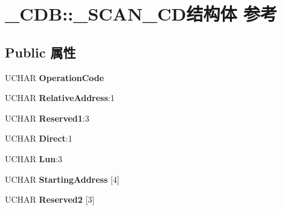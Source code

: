 \hypertarget{struct___c_d_b_1_1___s_c_a_n___c_d}{}\section{\+\_\+\+C\+DB\+:\+:\+\_\+\+S\+C\+A\+N\+\_\+\+C\+D结构体 参考}
\label{struct___c_d_b_1_1___s_c_a_n___c_d}
\subsection*{Public 属性}
\begin{DoxyCompactItemize}
\item 
\mbox{\label{struct___c_d_b_1_1___s_c_a_n___c_d_a2a7a7d76c1d5a0060f7855a33405addc}} 
U\+C\+H\+AR {\bfseries Operation\+Code}
\item 
\mbox{\label{struct___c_d_b_1_1___s_c_a_n___c_d_a9b01e1f32e7b703f6eb0a8378a0be89c}} 
U\+C\+H\+AR {\bfseries Relative\+Address}\+:1
\item 
\mbox{\label{struct___c_d_b_1_1___s_c_a_n___c_d_a214d9e380007d1fdadb6d8cce0f662ab}} 
U\+C\+H\+AR {\bfseries Reserved1}\+:3
\item 
\mbox{\label{struct___c_d_b_1_1___s_c_a_n___c_d_a9e21efede924f480050db7826cafb535}} 
U\+C\+H\+AR {\bfseries Direct}\+:1
\item 
\mbox{\label{struct___c_d_b_1_1___s_c_a_n___c_d_ae30f22d316cc8684063d58efca92b5af}} 
U\+C\+H\+AR {\bfseries Lun}\+:3
\item 
\mbox{\label{struct___c_d_b_1_1___s_c_a_n___c_d_aa4fad2ceeab1e68108b78feed5c5c12a}} 
U\+C\+H\+AR {\bfseries Starting\+Address} \mbox{[}4\mbox{]}
\item 
\mbox{\label{struct___c_d_b_1_1___s_c_a_n___c_d_adee83a7b26b0059bde8e92cb0e9462a9}} 
U\+C\+H\+AR {\bfseries Reserved2} \mbox{[}3\mbox{]}
\item 
\mbox{\label{struct___c_d_b_1_1___s_c_a_n___c_d_a664e7a9f186e6b00ac005db003f589a8}} 

\end{DoxyCompactItemize}
